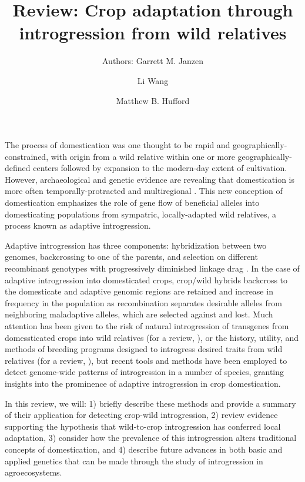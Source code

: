 \documentclass[11pt]{article}
\title{Review: Crop adaptation through introgression from wild relatives}
\author[1]{Authors: Garrett M. Janzen}%
\author[1]{Li Wang}
\author[1,*]{Matthew B. Hufford}
\affil[1]{Department of Ecology, Evolution, and Organismal Biology, Iowa State University, Ames, Iowa, USA}
\affil[*]{Correspondence: mhufford@iastate.edu (M.B. Hufford)}
\date{}
\begin{document}
\maketitle



The process of domestication was one thought to be rapid and geographically-constrained, with origin from a wild relative within one or more geographically-defined centers followed by expansion to the modern-day extent of cultivation.
However, archaeological and genetic evidence are revealing that domestication is more often temporally-protracted and multiregional \cite{brown2009complex}.
This new conception of domestication emphasizes the role of gene flow of beneficial alleles into domesticating populations from sympatric, locally-adapted wild relatives, a process known as adaptive introgression.



Adaptive introgression has three components: hybridization between two genomes, backcrossing to one of the parents, and selection on different recombinant genotypes with progressively diminished linkage drag \cite{barton2001role, Feuillet200824}.
In the case of adaptive introgression into domesticated crops, crop/wild hybrids backcross to the domesticate and adaptive genomic regions are retained and increase in frequency in the population as recombination separates desirable alleles from neighboring maladaptive alleles, which are selected against and lost.
Much attention has been given to the risk of natural introgression of transgenes from domessticated crops into wild relatives (for a review, \cite{stewart2003transgene}), or the history, utility, and methods of breeding programs designed to introgress desired traits from wild relatives (for a review, \cite{zamir2001improving, tanksley1997seed, hajjar2007use}), but recent tools and methods have been employed to detect genome-wide patterns of introgression in a number of species, granting insights into the prominence of adaptive introgression in crop domestication.


In this review, we will: 1) briefly describe these methods and provide a summary of their application for detecting crop-wild introgression, 2) review evidence supporting the hypothesis that wild-to-crop introgression has conferred local adaptation, 3) consider how the prevalence of this introgression alters traditional concepts of domestication, and 4) describe future advances in both basic and applied genetics that can be made through the study of introgression in agroecosystems.
\end{document}
